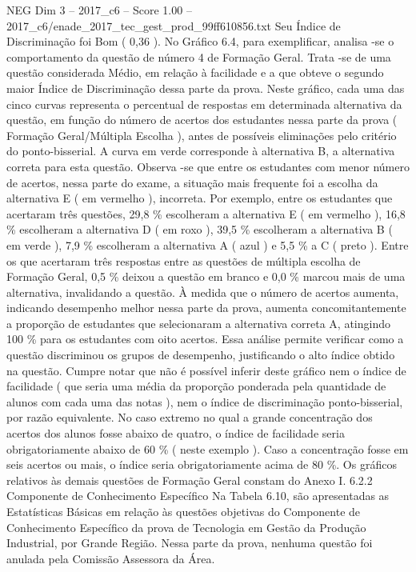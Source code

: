 \begin{textsample}{NEG Dim 3 – 2017\_c6 – Score 1.00 – 2017\_c6/enade\_2017\_tec\_gest\_prod\_99ff610856.txt}
Seu Índice de Discriminação foi Bom ( 0,36 ).
No Gráfico 6.4, para exemplificar, analisa -se o comportamento da questão de número 4 de Formação Geral.
Trata -se de uma questão considerada Médio, em relação à facilidade e a que obteve o segundo maior Índice de Discriminação dessa parte da prova.
Neste gráfico, cada uma das cinco curvas representa o percentual de respostas em determinada alternativa da questão, em função do número de acertos dos estudantes nessa parte da prova ( Formação Geral/Múltipla Escolha ), antes de possíveis eliminações pelo critério do ponto-bisserial.
A curva em verde corresponde à alternativa B, a alternativa correta para esta questão.
Observa -se que entre os estudantes com menor número de acertos, nessa parte do exame, a situação mais frequente foi a escolha da alternativa E ( em vermelho ), incorreta.
Por exemplo, entre os estudantes que acertaram três questões, 29,8 \% escolheram a alternativa E ( em vermelho ), 16,8 \% escolheram a alternativa D ( em roxo ), 39,5 \% escolheram a alternativa B ( em verde ), 7,9 \% escolheram a alternativa A ( azul ) e 5,5 \% a C ( preto ).
Entre os que acertaram três respostas entre as questões de múltipla escolha de Formação Geral, 0,5 \% deixou a questão em branco e 0,0 \% marcou mais de uma alternativa, invalidando a questão.
À medida que o número de acertos aumenta, indicando desempenho melhor nessa parte da prova, aumenta concomitantemente a proporção de estudantes que selecionaram a alternativa correta A, atingindo 100 \% para os estudantes com oito acertos.
Essa análise permite verificar como a questão discriminou os grupos de desempenho, justificando o alto índice obtido na questão.
Cumpre notar que não é possível inferir deste gráfico nem o índice de facilidade ( que seria uma média da proporção ponderada pela quantidade de alunos com cada uma das notas ), nem o índice de discriminação ponto-bisserial, por razão equivalente.
No caso extremo no qual a grande concentração dos acertos dos alunos fosse abaixo de quatro, o índice de facilidade seria obrigatoriamente abaixo de 60 \% ( neste exemplo ).
Caso a concentração fosse em seis acertos ou mais, o índice seria obrigatoriamente acima de 80 \%.
Os gráficos relativos às demais questões de Formação Geral constam do Anexo I. 6.2.2 Componente de Conhecimento Específico Na Tabela 6.10, são apresentadas as Estatísticas Básicas em relação às questões objetivas do Componente de Conhecimento Específico da prova de Tecnologia em Gestão da Produção Industrial, por Grande Região.
Nessa parte da prova, nenhuma questão foi anulada pela Comissão Assessora da Área.

\end{textsample}
